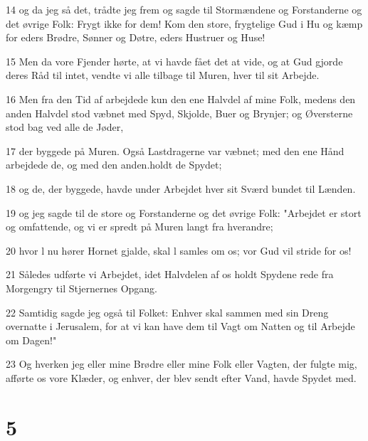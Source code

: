 \par 14 og da jeg så det, trådte jeg frem og sagde til Stormændene og Forstanderne og det øvrige Folk: Frygt ikke for dem! Kom den store, frygtelige Gud i Hu og kæmp for eders Brødre, Sønner og Døtre, eders Hustruer og Huse!
\par 15 Men da vore Fjender hørte, at vi havde fået det at vide, og at Gud gjorde deres Råd til intet, vendte vi alle tilbage til Muren, hver til sit Arbejde.
\par 16 Men fra den Tid af arbejdede kun den ene Halvdel af mine Folk, medens den anden Halvdel stod væbnet med Spyd, Skjolde, Buer og Brynjer; og Øversterne stod bag ved alle de Jøder,
\par 17 der byggede på Muren. Også Lastdragerne var væbnet; med den ene Hånd arbejdede de, og med den anden.holdt de Spydet;
\par 18 og de, der byggede, havde under Arbejdet hver sit Sværd bundet til Lænden.
\par 19 og jeg sagde til de store og Forstanderne og det øvrige Folk: "Arbejdet er stort og omfattende, og vi er spredt på Muren langt fra hverandre;
\par 20 hvor l nu hører Hornet gjalde, skal l samles om os; vor Gud vil stride for os!
\par 21 Således udførte vi Arbejdet, idet Halvdelen af os holdt Spydene rede fra Morgengry til Stjernernes Opgang.
\par 22 Samtidig sagde jeg også til Folket: Enhver skal sammen med sin Dreng overnatte i Jerusalem, for at vi kan have dem til Vagt om Natten og til Arbejde om Dagen!"
\par 23 Og hverken jeg eller mine Brødre eller mine Folk eller Vagten, der fulgte mig, afførte os vore Klæder, og enhver, der blev sendt efter Vand, havde Spydet med.

\chapter{5}


